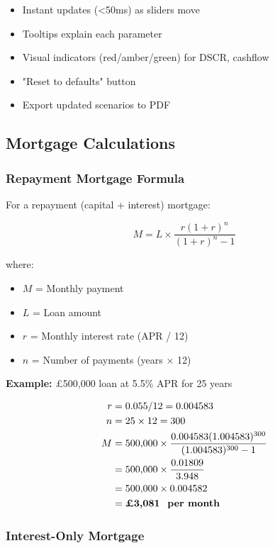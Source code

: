 \documentclass[11pt,a4paper]{article}
\begin{document}
\begin{itemize}
  \item Instant updates (<50ms) as sliders move
  \item Tooltips explain each parameter
  \item Visual indicators (red/amber/green) for DSCR, cashflow
  \item "Reset to defaults" button
  \item Export updated scenarios to PDF
\end{itemize}

\subsection{Mortgage Calculations}

\subsubsection{Repayment Mortgage Formula}

For a repayment (capital + interest) mortgage:

\[
M = L \times \frac{r(1+r)^n}{(1+r)^n - 1}
\]

where:
\begin{itemize}
  \item $M$ = Monthly payment
  \item $L$ = Loan amount
  \item $r$ = Monthly interest rate (APR / 12)
  \item $n$ = Number of payments (years × 12)
\end{itemize}

\textbf{Example:} £500,000 loan at 5.5\% APR for 25 years

\begin{align*}
r &= 0.055 / 12 = 0.004583 \\
n &= 25 \times 12 = 300 \\
M &= 500{,}000 \times \frac{0.004583(1.004583)^{300}}{(1.004583)^{300} - 1} \\
  &= 500{,}000 \times \frac{0.01809}{3.948} \\
  &= 500{,}000 \times 0.004582 \\
  &= \textbf{£3,081 \text{ per month}}
\end{align*}

\subsubsection{Interest-Only Mortgage}
\end{document}
